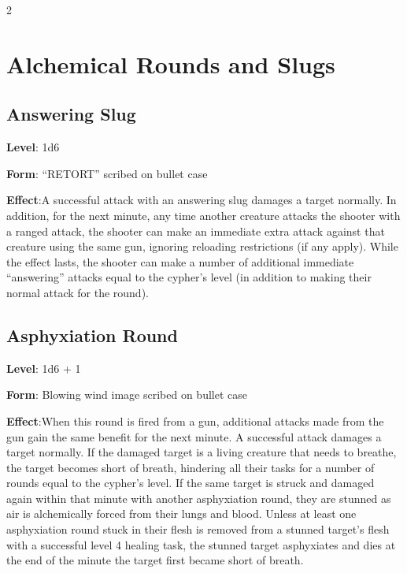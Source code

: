 \begin{multicols}{2}

\section{Alchemical Rounds and Slugs}

\subsection{Answering Slug}

\textbf{Level}: 1d6 

\textbf{Form}: “RETORT” scribed on bullet case 

\textbf{Effect}:A successful attack with an answering slug damages a target normally. In addition, for the next minute, any time another creature attacks the shooter with a ranged attack, the shooter can make an immediate extra attack against that creature using the same gun, ignoring reloading restrictions (if any apply). While the effect lasts, the shooter can make a number of additional immediate “answering” attacks equal to the cypher’s level (in addition to making their normal attack for the round).

\subsection{Asphyxiation Round}

\textbf{Level}: 1d6 + 1 

\textbf{Form}: Blowing wind image scribed on bullet case 

\textbf{Effect}:When this round is fired from a gun, additional attacks made from the gun gain the same benefit for the next minute. A successful attack damages a target normally. If the damaged target is a living creature that needs to breathe, the target becomes short of breath, hindering all their tasks for a number of rounds equal to the cypher’s level. If the same target is struck and damaged again within that minute with another asphyxiation round, they are stunned as air is alchemically forced from their lungs and blood. Unless at least one asphyxiation round stuck in their flesh is removed from a stunned target’s flesh with a successful level 4 healing task, the stunned target asphyxiates and dies at the end of the minute the target first became short of breath.


\end{multicols}
